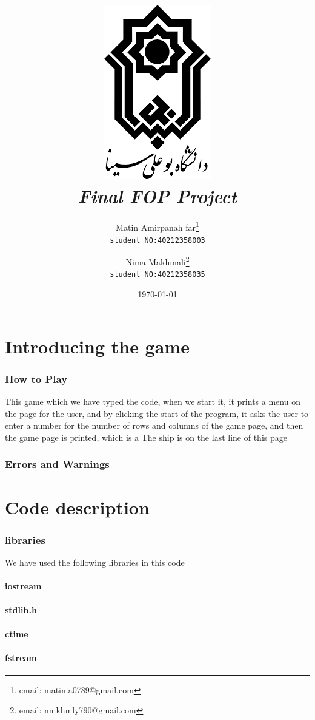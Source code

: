 \documentclass[12pt,a4paper]{article}
\title{\includegraphics[scale=0.5]{Graphics/BASU_Logo_header.png}\\[20pt] {\Huge \emph{Final FOP Project}}}
\author{Matin Amirpanah far\thanks{email: matin.a0789@gmail.com}\\
	\texttt{student NO:40212358003}\and
	Nima Makhmali\thanks{email: nmkhmly790@gmail.com}\\ \texttt{student NO:40212358035}}
\date{\today}
\begin{document}
	
	\maketitle
	
	\newpage
	\tableofcontents
	
	\newpage
	\setcounter{section}{0}
	\part{Introducing the game}\label{introducing}
        	
	\section{How to Play}\label{introducing.how}
	  This game which we have typed the code, when we start it, it prints a menu on the page for the user, and by clicking the start of the program, it asks the user to enter a number for the number of rows and columns of the game page, and then the game page is printed, which is a The ship is on the last line of this page
	\section{Errors and Warnings}\label{introducing.errors}
	
	
	\newpage
	\setcounter{section}{0}
	\part{Code description}\label{description}
	
	\section{libraries}\label{description.libraries}
	We have used the following libraries in this code
	\subsection{iostream}
	\subsection{stdlib.h}
	\subsection{ctime}
	\subsection{fstream}
\end{document}

